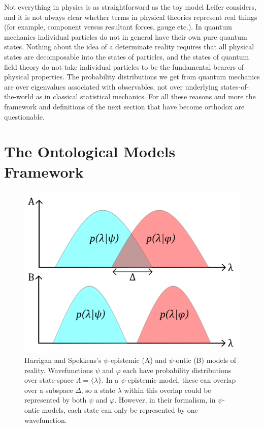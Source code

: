 \documentclass[superscriptaddress, floatfix,nofootinbib,12pt]{revtex4-2}
\begin{document}
Not everything in physics is as straightforward as the toy model Leifer considers, and it is not always clear whether terms in physical theories represent real things (for example, component versus resultant forces, gauge etc.). In quantum mechanics individual particles do not in general have their own pure quantum states. Nothing about the idea of a determinate reality requires that all physical states are decomposable into the states of particles, and the states of quantum field theory do not take individual particles to be the fundamental bearers of physical properties. The probability distributions we get from quantum mechanics are over eigenvalues associated with observables, not over underlying states-of-the-world as in classical statistical mechanics. For all these reasons and more the framework and definitions of the next section that have become orthodox are questionable.

\section{The Ontological Models Framework}

\begin{figure}
    \centering
    \includegraphics[width=\linewidth]{StateOverlapDiag.pdf}
    \caption{Harrigan and Spekkens's $\psi$-epistemic (A) and $\psi$-ontic (B) models of reality. Wavefunctions $\psi$ and $\varphi$ each have probability distributions over state-space $\Lambda=\{\lambda\}$. In a $\psi$-epistemic model, these can overlap over a subspace \textit{$\Delta$}, so a state $\lambda$ within this overlap could be represented by both $\psi$ and $\varphi$. However, in their formalism, in $\psi$-ontic models, each state can only be represented by one wavefunction.}
    \label{fig:Graphs}
\end{figure}
\end{document}

